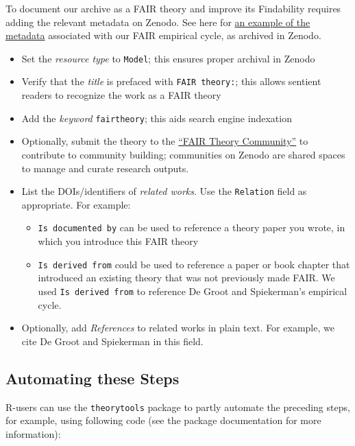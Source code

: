 \documentclass[
  man, noextraspace,floatsintext]{apa6}
\providecommand{\tightlist}{%
  \setlength{\itemsep}{0pt}\setlength{\parskip}{0pt}}
\begin{document}
To document our archive as a FAIR theory and improve its Findability requires adding the relevant metadata on Zenodo.
See here for \href{https://raw.githubusercontent.com/cjvanlissa/fair_theory/refs/heads/main/example_metadata.json}{an example of the metadata} associated with our FAIR empirical cycle, as archived in Zenodo.

\begin{itemize}
\tightlist
\item
  Set the \emph{resource type} to \texttt{Model}; this ensures proper archival in Zenodo
\item
  Verify that the \emph{title} is prefaced with \texttt{FAIR\ theory:}; this allows sentient readers to recognize the work as a FAIR theory
\item
  Add the \emph{keyword} \texttt{fairtheory}; this aids search engine indexation
\item
  Optionally, submit the theory to the \href{https://zenodo.org/communities/fairtheory}{``FAIR Theory Community''} to contribute to community building; communities on Zenodo are shared spaces to manage and curate research outputs.
\item
  List the DOIs/identifiers of \emph{related works}. Use the \texttt{Relation} field as appropriate. For example:

  \begin{itemize}
  \tightlist
  \item
    \texttt{Is\ documented\ by} can be used to reference a theory paper you wrote, in which you introduce this FAIR theory
  \item
    \texttt{Is\ derived\ from} could be used to reference a paper or book chapter that introduced an existing theory that was not previously made FAIR. We used \texttt{Is\ derived\ from} to reference De Groot and Spiekerman's empirical cycle.
  \end{itemize}
\item
  Optionally, add \emph{References} to related works in plain text. For example, we cite De Groot and Spiekerman in this field.
\end{itemize}

\subsection{Automating these Steps}\label{automating-these-steps}

R-users can use the \texttt{theorytools} package to partly automate the preceding steps, for example, using following code (see the package documentation for more information):
\end{document}
